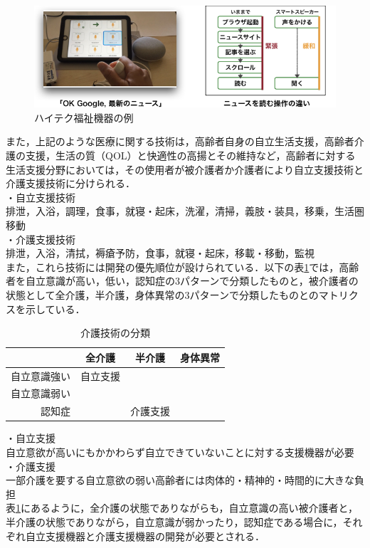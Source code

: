 \begin{figure}[htb]
 \begin{center}
 \includegraphics[scale=0.4]{figures/yubicommunication.png}
 \caption[ハイテク福祉機器の例]{ハイテク福祉機器の例 \label{yubicommnnication}}
 \end{center}
\end{figure}

また，上記のような医療に関する技術は，高齢者自身の自立生活支援，高齢者介護の支援，生活の質（QOL）と快適性の高揚とその維持など，高齢者に対する生活支援分野においては，その使用者が被介護者か介護者により自立支援技術と介護支援技術に分けられる．\\
・自立支援技術 \\
排泄，入浴，調理，食事，就寝・起床，洗濯，清掃，義肢・装具，移乗，生活圏移動 \\
・介護支援技術 \\
排泄，入浴，清拭，褥瘡予防，食事，就寝・起床，移載・移動，監視 \\
また，これら技術には開発の優先順位が設けられている．以下の表\ref{tech_classification}では，高齢者を自立意識が高い，低い，認知症の3パターンで分類したものと，被介護者の状態として全介護，半介護，身体異常の3パターンで分類したものとのマトリクスを示している．

\begin{table}[htb]
  \caption[介護技術の分類]{介護技術の分類}
  \label{tech_classification}
  \centering
  \begin{tabular}{r|c|c|c}
     & 全介護 & 半介護 & 身体異常 \\ \hline
    自立意識強い & 自立支援 & \quad & \quad \\
    自立意識弱い & \quad & \quad &  \quad \\
    認知症 & \quad & 介護支援 & \quad \\
    \end{tabular}
\end{table}

・自立支援 \\
自立意欲が高いにもかかわらず自立できていないことに対する支援機器が必要 \\
・介護支援 \\
一部介護を要する自立意欲の弱い高齢者には肉体的・精神的・時間的に大きな負担 \\
表\ref{tech_classification}にあるように，全介護の状態でありながらも，自立意識の高い被介護者と，半介護の状態でありながら，自立意識が弱かったり，認知症である場合に，それぞれ自立支援機器と介護支援機器の開発が必要とされる．

